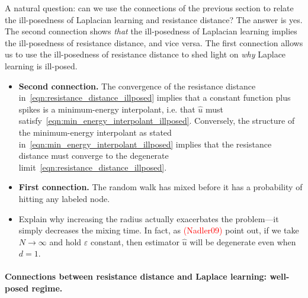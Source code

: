 \documentclass{article}
\newcommand{\1}{\mathbf{1}}
\newcommand{\wh}[1]{\widehat{#1}}
\theoremstyle{definition}
\theoremstyle{remark}
\begin{document}
A natural question: can we use the connections of the previous section to relate the ill-posedness of Laplacian learning and resistance distance? The answer is yes. The second connection shows \emph{that} the ill-posedness of Laplacian learning implies the ill-posedness of resistance distance, and vice versa. The first connection allows us to use the ill-posedness of resistance distance to shed light on \emph{why} Laplace learning is ill-posed. 
\begin{itemize}
	\item \textbf{Second connection.} The convergence of the resistance distance in~\eqref{eqn:resistance_distance_illposed} implies that a constant function plus spikes is a minimum-energy interpolant, i.e. that $\wh{u}$ must satisfy~\eqref{eqn:min_energy_interpolant_illposed}. Conversely, the structure of the minimum-energy interpolant as stated in~\eqref{eqn:min_energy_interpolant_illposed} implies that the resistance distance must converge to the degenerate limit~\eqref{eqn:resistance_distance_illposed}.
	\item \textbf{First connection.} The random walk has mixed before it has a probability of hitting any labeled node.
	\item Explain why increasing the radius actually exacerbates the problem---it simply decreases the mixing time. In fact, as \textcolor{red}{(Nadler09)} point out, if we take $N \to \infty$ and hold $\varepsilon$ constant, then estimator $\wh{u}$ will be degenerate even when $d = 1$.
\end{itemize}

\paragraph{Connections between resistance distance and Laplace learning: well-posed regime.}
\end{document}
